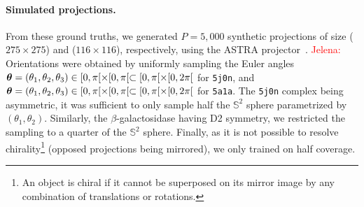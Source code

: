 \paragraph{Simulated projections.}
From these ground truths, we generated $P=5,000$ synthetic projections of size ($275\times 275$) and ($116\times 116$), respectively, using the ASTRA projector~\cite{van2015astra}.
\textcolor{red}{Jelena:} Orientations were obtained by uniformly sampling the Euler angles ${\boldsymbol{\theta}}=(\theta_1,\theta_2,\theta_3) \in [0, \pi[ \times [0, \pi[ \subset [0, \pi[ \times [0, 2\pi[$ for \texttt{5j0n}, and ${\boldsymbol{\theta}}=(\theta_1,\theta_2,\theta_3) \in [0, \pi[ \times [0, \pi[ \subset [0, \pi[ \times [0, 2\pi[$ for \texttt{5a1a}. 
The \texttt{5j0n} complex being asymmetric, it was sufficient to only sample half  the $\mathbb{S}^2$ sphere parametrized by $(\theta_1,\theta_2)$.
Similarly, the $\beta$-galactosidase having D2 symmetry, %
 we restricted the sampling to a quarter of the $\mathbb{S}^2$ sphere.
Finally, as it is not possible to resolve chirality\footnote{An object is chiral if it cannot be superposed on its mirror image by any combination of translations or rotations.} (opposed projections being mirrored), we only trained on half coverage.

